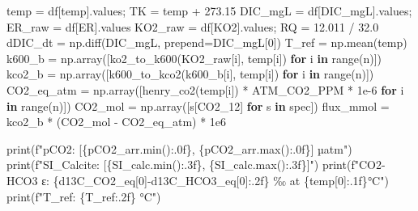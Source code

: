 \documentclass[
  letterpaper,
  DIV=11,
  numbers=noendperiod]{scrartcl}
\newenvironment{Shaded}{\begin{snugshade}}{\end{snugshade}}
\newcommand{\BuiltInTok}[1]{\textcolor[rgb]{0.00,0.23,0.31}{#1}}
\newcommand{\ControlFlowTok}[1]{\textcolor[rgb]{0.00,0.23,0.31}{\textbf{#1}}}
\newcommand{\DecValTok}[1]{\textcolor[rgb]{0.68,0.00,0.00}{#1}}
\newcommand{\FloatTok}[1]{\textcolor[rgb]{0.68,0.00,0.00}{#1}}
\newcommand{\KeywordTok}[1]{\textcolor[rgb]{0.00,0.23,0.31}{\textbf{#1}}}
\newcommand{\NormalTok}[1]{\textcolor[rgb]{0.00,0.23,0.31}{#1}}
\newcommand{\OperatorTok}[1]{\textcolor[rgb]{0.37,0.37,0.37}{#1}}
\newcommand{\SpecialCharTok}[1]{\textcolor[rgb]{0.37,0.37,0.37}{#1}}
\newcommand{\SpecialStringTok}[1]{\textcolor[rgb]{0.13,0.47,0.30}{#1}}
\newcommand{\StringTok}[1]{\textcolor[rgb]{0.13,0.47,0.30}{#1}}
\begin{document}
\begin{Shaded}
\begin{Highlighting}[]
\NormalTok{temp    }\OperatorTok{=}\NormalTok{ df[}\StringTok{\textquotesingle{}temp\textquotesingle{}}\NormalTok{].values}\OperatorTok{;}\NormalTok{    TK }\OperatorTok{=}\NormalTok{ temp }\OperatorTok{+} \FloatTok{273.15}
\NormalTok{DIC\_mgL }\OperatorTok{=}\NormalTok{ df[}\StringTok{\textquotesingle{}DIC\_mgL\textquotesingle{}}\NormalTok{].values}\OperatorTok{;}\NormalTok{ ER\_raw }\OperatorTok{=}\NormalTok{ df[}\StringTok{\textquotesingle{}ER\textquotesingle{}}\NormalTok{].values}
\NormalTok{KO2\_raw }\OperatorTok{=}\NormalTok{ df[}\StringTok{\textquotesingle{}KO2\textquotesingle{}}\NormalTok{].values}\OperatorTok{;}\NormalTok{     RQ }\OperatorTok{=} \FloatTok{12.011} \OperatorTok{/} \FloatTok{32.0}
\NormalTok{dDIC\_dt }\OperatorTok{=}\NormalTok{ np.diff(DIC\_mgL, prepend}\OperatorTok{=}\NormalTok{DIC\_mgL[}\DecValTok{0}\NormalTok{])}
\NormalTok{T\_ref   }\OperatorTok{=}\NormalTok{ np.mean(temp)}
\NormalTok{k600\_b     }\OperatorTok{=}\NormalTok{ np.array([ko2\_to\_k600(KO2\_raw[i], temp[i]) }\ControlFlowTok{for}\NormalTok{ i }\KeywordTok{in} \BuiltInTok{range}\NormalTok{(n)])}
\NormalTok{kco2\_b     }\OperatorTok{=}\NormalTok{ np.array([k600\_to\_kco2(k600\_b[i], temp[i]) }\ControlFlowTok{for}\NormalTok{ i }\KeywordTok{in} \BuiltInTok{range}\NormalTok{(n)])}
\NormalTok{CO2\_eq\_atm }\OperatorTok{=}\NormalTok{ np.array([henry\_co2(temp[i]) }\OperatorTok{*}\NormalTok{ ATM\_CO2\_PPM }\OperatorTok{*} \FloatTok{1e{-}6} \ControlFlowTok{for}\NormalTok{ i }\KeywordTok{in} \BuiltInTok{range}\NormalTok{(n)])}
\NormalTok{CO2\_mol    }\OperatorTok{=}\NormalTok{ np.array([s[}\StringTok{\textquotesingle{}CO2\_12\textquotesingle{}}\NormalTok{] }\ControlFlowTok{for}\NormalTok{ s }\KeywordTok{in}\NormalTok{ spec])}
\NormalTok{flux\_mmol  }\OperatorTok{=}\NormalTok{ kco2\_b }\OperatorTok{*}\NormalTok{ (CO2\_mol }\OperatorTok{{-}}\NormalTok{ CO2\_eq\_atm) }\OperatorTok{*} \FloatTok{1e6}

\BuiltInTok{print}\NormalTok{(}\SpecialStringTok{f"pCO2:       [}\SpecialCharTok{\{}\NormalTok{pCO2\_arr}\SpecialCharTok{.}\BuiltInTok{min}\NormalTok{()}\SpecialCharTok{:.0f\}}\SpecialStringTok{, }\SpecialCharTok{\{}\NormalTok{pCO2\_arr}\SpecialCharTok{.}\BuiltInTok{max}\NormalTok{()}\SpecialCharTok{:.0f\}}\SpecialStringTok{] µatm"}\NormalTok{)}
\BuiltInTok{print}\NormalTok{(}\SpecialStringTok{f"SI\_Calcite: [}\SpecialCharTok{\{}\NormalTok{SI\_calc}\SpecialCharTok{.}\BuiltInTok{min}\NormalTok{()}\SpecialCharTok{:.3f\}}\SpecialStringTok{, }\SpecialCharTok{\{}\NormalTok{SI\_calc}\SpecialCharTok{.}\BuiltInTok{max}\NormalTok{()}\SpecialCharTok{:.3f\}}\SpecialStringTok{]"}\NormalTok{)}
\BuiltInTok{print}\NormalTok{(}\SpecialStringTok{f"CO2{-}HCO3 ε: }\SpecialCharTok{\{}\NormalTok{d13C\_CO2\_eq[}\DecValTok{0}\NormalTok{]}\OperatorTok{{-}}\NormalTok{d13C\_HCO3\_eq[}\DecValTok{0}\NormalTok{]}\SpecialCharTok{:.2f\}}\SpecialStringTok{ ‰ at }\SpecialCharTok{\{}\NormalTok{temp[}\DecValTok{0}\NormalTok{]}\SpecialCharTok{:.1f\}}\SpecialStringTok{°C"}\NormalTok{)}
\BuiltInTok{print}\NormalTok{(}\SpecialStringTok{f"T\_ref:      }\SpecialCharTok{\{}\NormalTok{T\_ref}\SpecialCharTok{:.2f\}}\SpecialStringTok{ °C"}\NormalTok{)}
\end{Highlighting}
\end{Shaded}
\end{document}

